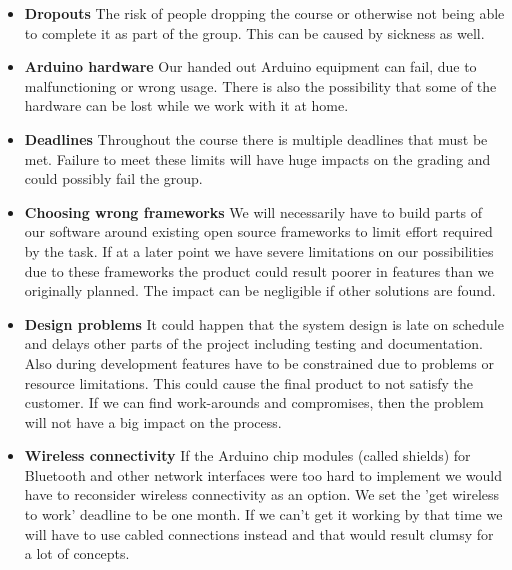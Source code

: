 \begin{itemize}

\item \textbf{Dropouts}\newline
The risk of people dropping the course or otherwise not being able to complete it as part
of the group. This can be caused by sickness as well.

\item \textbf{Arduino hardware}\newline
Our handed out Arduino equipment can fail, due to malfunctioning or wrong usage.
There is also the possibility that some of the hardware can be lost while we work with it at home.

\item \textbf{Deadlines}\newline
Throughout the course there is multiple deadlines that must be met. Failure to meet
these limits will have huge impacts on the grading and could possibly fail the group.

\item \textbf{Choosing wrong frameworks}\newline
We will necessarily have to build parts of our software around existing open source
frameworks to limit effort required by the task. If at a later point we have severe limitations
on our possibilities due to these frameworks the product could result poorer in features than
we originally planned. The impact can be negligible if other solutions are found.

\item \textbf{Design problems}\newline
It could happen that the system design is late on schedule and delays other parts of the project
including testing and documentation. Also during development features have to be constrained due to problems
or resource limitations. This could cause the final product to not satisfy the customer.
If we can find work-arounds and compromises, then the problem will not have a big impact on the process.

\item \textbf{Wireless connectivity}\newline
If the Arduino chip modules (called shields) for Bluetooth and other network interfaces were too
hard to implement we would have to reconsider wireless connectivity as an option.
We set the 'get wireless to work' deadline to be one month. If we can't get it working
by that time we will have to use cabled connections instead and that would result clumsy
for a lot of concepts.
\end{itemize}

